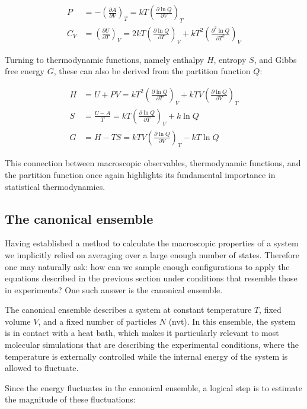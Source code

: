 \begin{align}
    P &= -\left(\frac{\partial A}{\partial V}\right)_T = kT\left(\frac{\partial \ln Q}{\partial V}\right)_T \\
    C_V &= \left(\frac{\partial U}{\partial T}\right)_V = 2kT\left(\frac{\partial \ln Q}{\partial T}\right)_V + kT^2\left(\frac{\partial^2 \ln Q}{\partial T^2}\right)_V
\end{align}

Turning to thermodynamic functions, namely enthalpy $H$, entropy $S$, and Gibbs free energy $G$, these can also be derived from the partition function $Q$:

\begin{align}
    H &= U + PV = kT^2\left(\frac{\partial \ln Q}{\partial T}\right)_V + kTV\left(\frac{\partial \ln Q}{\partial V}\right)_T \\
    S &= \frac{U-A}{T} = kT\left(\frac{\partial \ln Q}{\partial T}\right)_V + k\ln Q \\
    G &= H - TS = kTV\left(\frac{\partial \ln Q}{\partial V}\right)_T - kT\ln Q
\end{align}

This connection between macroscopic observables, thermodynamic functions, and the partition function once again highlights its fundamental importance in statistical thermodynamics.



\subsection{The canonical ensemble}
Having established a method to calculate the macroscopic properties of a system we implicitly relied on averaging over a large enough number of states. Therefore one may naturally ask: how can we sample enough configurations to apply the equations described in the previous section under conditions that resemble those in experiments? One such answer is the canonical ensemble.

The canonical ensemble describes a system at constant temperature $T$, fixed volume $V$, and a fixed number of particles $N$ (\acs{nvt}). In this ensemble, the system is in contact with a heat bath, which makes it particularly relevant to most molecular simulations that are describing the experimental conditions, where the temperature is externally controlled while the internal energy of the system is allowed to fluctuate.

Since the energy fluctuates in the canonical ensemble, a logical step is to estimate the magnitude of these fluctuations:

